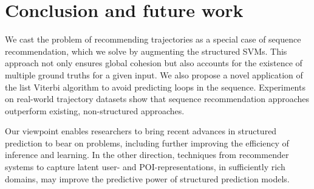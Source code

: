 
\section{Conclusion and future work}

We cast the problem of recommending trajectories as a special case of sequence recommendation,
which we solve by augmenting the structured SVMs.
This approach not only ensures global cohesion but also accounts for the existence of multiple ground truths for a given input.
We also propose a novel application of the list Viterbi algorithm to avoid predicting loops in the sequence.
%
%
Experiments on real-world trajectory datasets show that
sequence recommendation approaches outperform existing, non-structured approaches.

Our viewpoint enables researchers to bring recent advances in structured prediction
to bear on {\trajrec} problems,
including further improving the efficiency of inference and learning.
In the other direction, techniques from recommender systems to capture latent
user- and POI-representations, in sufficiently rich domains, may
improve the predictive power of structured prediction models.

